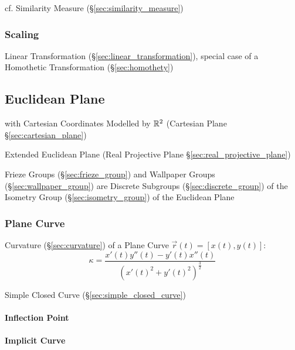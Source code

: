\fist cf. Similarity Measure (\S\ref{sec:similarity_measure})



\subsubsection{Scaling}\label{sec:scaling}

Linear Transformation (\S\ref{sec:linear_transformation}), special case of a
Homothetic Transformation (\S\ref{sec:homothety})



\subsection{Euclidean Plane}\label{sec:euclidean_plane}

with Cartesian Coordinates Modelled by $\mathbb{R}^2$ (Cartesian Plane
\S\ref{sec:cartesian_plane})

\fist Extended Euclidean Plane (Real Projective Plane
\S\ref{sec:real_projective_plane})

Frieze Groups (\S\ref{sec:frieze_group}) and Wallpaper Groups
(\S\ref{sec:wallpaper_group}) are Discrete Subgroups
(\S\ref{sec:discrete_group}) of the Isometry Group (\S\ref{sec:isometry_group})
of the Euclidean Plane



\subsubsection{Plane Curve}\label{sec:plane_curve}

Curvature (\S\ref{sec:curvature}) of a Plane Curve $\vec{r}(t) = [x(t),y(t)]$:
\[
  \kappa = \frac{x'(t)y''(t) - y'(t)x''(t)} {(x'(t)^2 + y'(t)^2)^{\frac{3}{2}}}
\]

\fist Simple Closed Curve (\S\ref{sec:simple_closed_curve})



\paragraph{Inflection Point}\label{sec:inflection_point}\hfill

\paragraph{Implicit Curve}\label{sec:implicit_curve}\hfill

